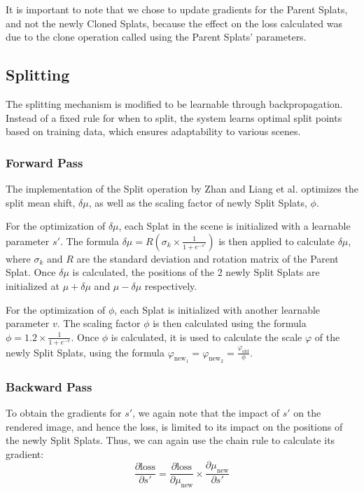 \documentclass[11pt]{report}
\begin{document}
It is important to note that we chose to update gradients for the Parent Splats, and not the newly Cloned Splats, because the effect on the loss calculated was due to the clone operation called using the Parent Splats' parameters.

\subsection{Splitting}
The splitting mechanism is modified to be learnable through backpropagation. Instead of a fixed rule for when to split, the system learns optimal split points based on training data, which ensures adaptability to various scenes.

\subsubsection{Forward Pass}
The implementation of the Split operation by Zhan and Liang et al. optimizes the split mean shift, $\delta \mu$, as well as the scaling factor of newly Split Splats, $\phi$.

For the optimization of $\delta \mu$, each Splat in the scene is initialized with a learnable parameter $s'$. The formula $\delta \mu = R(\sigma_{k} \times \frac{1}{1 + e^{-s'}})$ is then applied to calculate $\delta \mu$, where $\sigma_{k}$ and $R$ are the standard deviation and rotation matrix of the Parent Splat. Once $\delta \mu$ is calculated, the positions of the 2 newly Split Splats are initialized at $\mu + \delta \mu$ and $\mu - \delta \mu$ respectively.

For the optimization of $\phi$, each Splat is initialized with another learnable parameter $v$. The scaling factor $\phi$ is then calculated using the formula $\phi = 1.2 \times \frac{1}{1 + e^{-v}}$. Once $\phi$ is calculated, it is used to calculate the scale $\varphi$ of the newly Split Splats, using the formula $\varphi_{\text{new}_1} =  \varphi_{\text{new}_2} = \frac{\varphi_{\text{old}}}{\phi}$.

\subsubsection{Backward Pass}
To obtain the gradients for $s'$, we again note that the impact of $s'$ on the rendered image, and hence the loss, is limited to its impact on the positions of the newly Split Splats. Thus, we can again use the chain rule to calculate its gradient:
\[ \frac{\partial \text{loss}}{\partial s'} = \frac{\partial \text{loss}}{\partial \mu_{\text{new}}} \times \frac{\partial \mu_{\text{new}}}{\partial s'} \]
\end{document}
